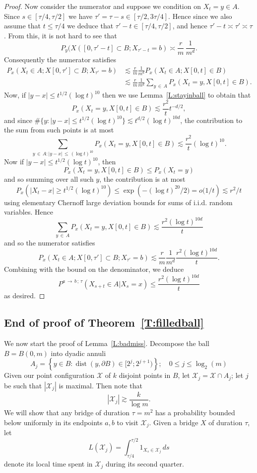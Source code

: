 \documentclass[AHL, Unicode, longabstracts, published]{cedram}
\DeclareMathOperator{\dist}{dist}
\newcommand{\Pmh}{P}
\newcommand{\cX}{\mathcal{X}}
\begin{document}
\begin{proof}
Now consider the numerator and suppose we condition on $X_t = y \in A$. Since $s \in [\tau/4, \tau/2]$ we have $\tau' = \tau - s \in [\tau/2, 3\tau/4]$. Hence since we also assume that $t \le \tau/4$ we deduce that $\tau' - t \in [\tau/4, \tau/2]$, and hence $\tau' - t \asymp \tau' \asymp \tau$. From this, it is not hard to see that
\[
\Pmh_y(X([0, \tau' - t] \subset B; X_{\tau' - t} = b) \asymp \frac{r}{m}\,\frac1{m^d}.
\]
Consequently the numerator satisfies
\begin{align*}
\Pmh_x(X_t \in A ; X[0, \tau'] \subset B ; X_{\tau'} = b) &\lesssim \frac{r}{m}\frac1{m^d} \Pmh_x(X_t \in A ; X[0,t] \in B)\\
&\lesssim \frac{r}{m} \frac1{m^d} \sum_{y\,\in\,A} \Pmh_x(X_t = y, X[0, t] \in B).
\end{align*}
Now, if $| y - x | \le t^{1/2} (\log t)^{10}$ then we use Lemma~\ref{L:stayinball} to obtain that
\[
\Pmh_x(X_t = y, X[0, t] \in B) \lesssim \frac{r^2}{t} t^{ - d/2},
\]
and since $\#\{ y : | y - x | \le t^{1/2} (\log t)^{10} \} \lesssim t^{d/2} (\log t)^{10d}$, the contribution to the sum from such points is at most
\[
\sum_{ y\,\in\,A: | y - x|\,\le\,(\log t)^{10}} \Pmh_x(X_t = y, X[0, t] \in B) \lesssim \frac{r^2}{t} (\log t)^{10}.
\]
Now if $ | y - x | \le t^{1/2} (\log t)^{10}$, then
\[
\Pmh_x(X_t = y, X[0, t] \in B) \le \Pmh_x (X_t = y)
\]
and so summing over all such $y$, the contribution is at most
\[
\Pmh_x \left(|X_t - x | \ge t^{1/2} (\log t)^{10}\right) \le \exp\left(- (\log t)^{20}/2) = o(1/t\right) \lesssim r^2/t
\]
using elementary Chernoff large deviation bounds for sums of i.i.d. random variables. Hence
\[
\sum_{ y\,\in\,A} \Pmh_x(X_t = y, X[0, t] \in B) \lesssim \frac{r^2(\log t)^{10d}}{t}
\]
and so the numerator satisfies
\[
\Pmh_x(X_t \in A ; X[0, \tau'] \subset B ; X_{\tau'} = b) \lesssim \frac{r}{m} \frac1{m^d} \frac{r^2(\log t)^{10d}}{t}.
\]
Combining with the bound on the denominator, we deduce
\[
\Pmh^{a\,\to\,b\,;\,\tau}(X_{s+t} \in A |X_s=x) \le \frac{r^2(\log t)^{10d}}{t}
\]
as desired.
\end{proof}

\subsection{End of proof of Theorem~\ref{T:filledball}}\label{S:moment}

We now start the proof of Lemma~\ref{L:badmiss}. Decompose the ball $B = B(0,m)$ into dyadic annuli
\[
A_j = \left\{ y \in B :{\dist (y, \partial B)} \in [2^j; 2^{j+1})\right\}
; \quad 0 \le j \le \log_2(m)
\]
Given our point configuration $\cX$ of $k$ disjoint points in $B$, let $\cX_j = \cX \cap A_j$; let $j$ be such that $|\cX_j|$ is maximal. Then note that
\[
|\cX_j| \gtrsim \frac{k}{\log m}.
\]
We will show that any bridge of duration $\tau = m^2$ has a probability bounded below uniformly in its endpoints $a,b$ to visit $\cX_j$. Given a bridge $X$ of duration $\tau$, let
\[
L (\cX_j) = \int_{\tau/4}^{\tau/2} 1_{X_s \in \cX_j}\,ds
\]
denote its local time spent in $\cX_j$ during its second quarter.
\end{document}
